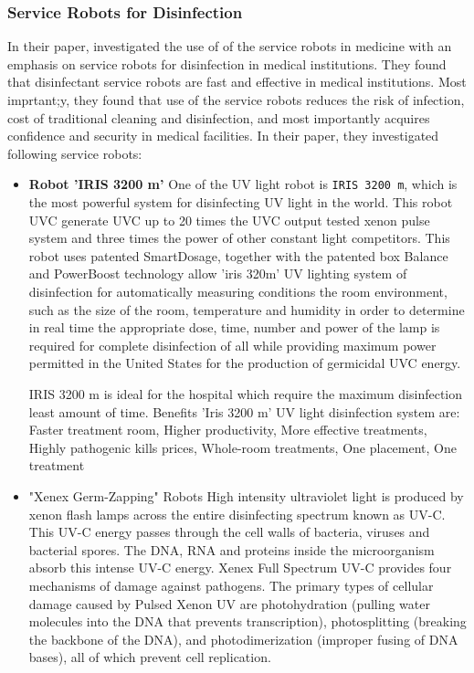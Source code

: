 \documentclass[letterpaper]{article} %
\begin{document}
\subsubsection{Service Robots for Disinfection}
In their paper, \cite{Begic2018} investigated the use of of the service robots in medicine with an emphasis on service robots for disinfection in medical institutions. They found that  disinfectant service robots are fast and effective in medical institutions.  Most imprtant;y, they found that use of the service robots reduces the risk of infection, cost of traditional cleaning and disinfection, and most importantly acquires confidence and security in medical facilities. In their paper, they investigated following service robots:
\begin{itemize}
	\item \textbf{Robot 'IRIS 3200 m'}
	One of the UV light robot is \verb|IRIS 3200 m|, which  is the most powerful system for disinfecting UV light in the world. This robot   UVC generate UVC  up to 20 times the UVC output tested xenon pulse system and three times the power of other constant light competitors.
	This robot uses  patented SmartDosage, together with the patented box Balance and PowerBoost technology allow 'iris 320m' UV lighting system of disinfection for automatically measuring conditions the room environment, such as the size of the room, temperature and humidity in order to determine in real time the appropriate dose, time, number and power of the lamp is required for complete disinfection of all while providing maximum power permitted in the United States for the production of germicidal UVC energy.
	
	IRIS 3200 m is ideal for the hospital which require the maximum disinfection least amount of time. Benefits 'Iris 3200 m' UV light disinfection system are: Faster treatment room, Higher productivity, More effective treatments, Highly pathogenic kills prices, Whole-room treatments, One placement, One treatment
	
	\item "Xenex Germ-Zapping" Robots
	High intensity ultraviolet light is produced by xenon flash lamps across the entire disinfecting spectrum known as UV-C. This UV-C energy passes through the cell walls of bacteria, viruses and bacterial spores. The DNA, RNA and proteins inside the microorganism absorb this intense UV-C energy. Xenex Full Spectrum UV-C provides four mechanisms of damage against pathogens. 
	The primary types of cellular damage caused by Pulsed Xenon UV are photohydration (pulling water molecules into the DNA that prevents transcription), photosplitting (breaking the backbone of the DNA), and photodimerization (improper fusing of DNA bases), all of which prevent cell replication.
\end{itemize}
\end{document}

